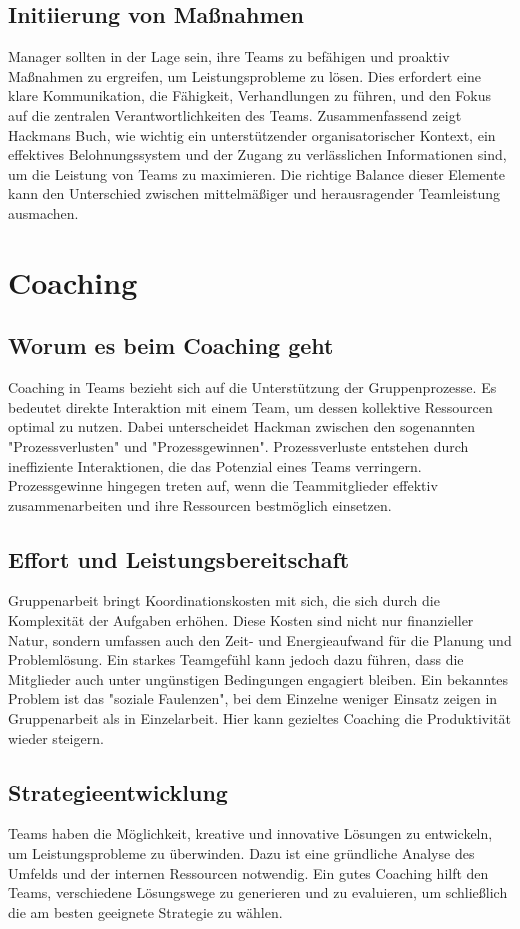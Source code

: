 \subsection{Initiierung von Maßnahmen}
Manager sollten in der Lage sein, ihre Teams zu befähigen und proaktiv Maßnahmen zu ergreifen, um Leistungsprobleme zu lösen. Dies erfordert eine klare Kommunikation, die Fähigkeit, Verhandlungen zu führen, und den Fokus auf die zentralen Verantwortlichkeiten des Teams.
Zusammenfassend zeigt Hackmans Buch, wie wichtig ein unterstützender organisatorischer Kontext, ein effektives Belohnungssystem und der Zugang zu verlässlichen Informationen sind, um die Leistung von Teams zu maximieren. Die richtige Balance dieser Elemente kann den Unterschied zwischen mittelmäßiger und herausragender Teamleistung ausmachen.

\section{Coaching}

\subsection{Worum es beim Coaching geht}
Coaching in Teams bezieht sich auf die Unterstützung der Gruppenprozesse. Es bedeutet direkte Interaktion mit einem Team, um dessen kollektive Ressourcen optimal zu nutzen. Dabei unterscheidet Hackman zwischen den sogenannten "Prozessverlusten" und "Prozessgewinnen". Prozessverluste entstehen durch ineffiziente Interaktionen, die das Potenzial eines Teams verringern. Prozessgewinne hingegen treten auf, wenn die Teammitglieder effektiv zusammenarbeiten und ihre Ressourcen bestmöglich einsetzen.
\subsection{Effort und Leistungsbereitschaft}
Gruppenarbeit bringt Koordinationskosten mit sich, die sich durch die Komplexität der Aufgaben erhöhen. Diese Kosten sind nicht nur finanzieller Natur, sondern umfassen auch den Zeit- und Energieaufwand für die Planung und Problemlösung. Ein starkes Teamgefühl kann jedoch dazu führen, dass die Mitglieder auch unter ungünstigen Bedingungen engagiert bleiben. Ein bekanntes Problem ist das "soziale Faulenzen", bei dem Einzelne weniger Einsatz zeigen in Gruppenarbeit als in Einzelarbeit. Hier kann gezieltes Coaching die Produktivität wieder steigern.
\subsection{Strategieentwicklung}
Teams haben die Möglichkeit, kreative und innovative Lösungen zu entwickeln, um Leistungsprobleme zu überwinden. Dazu ist eine gründliche Analyse des Umfelds und der internen Ressourcen notwendig. Ein gutes Coaching hilft den Teams, verschiedene Lösungswege zu generieren und zu evaluieren, um schließlich die am besten geeignete Strategie zu wählen.
